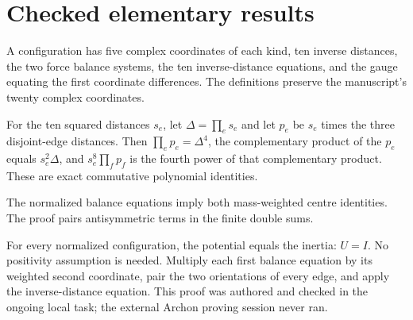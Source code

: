 \chapter{Checked elementary results}

\begin{definition}
\label{bp:configuration}
\leanok
A configuration has five complex coordinates of each kind, ten inverse
distances, the two force balance systems, the ten inverse-distance equations,
and the gauge equating the first coordinate differences.
The definitions preserve the manuscript's twenty complex coordinates.
\end{definition}

\begin{lemma}
\label{bp:products}
\leanok
For the ten squared distances $s_e$, let $\Delta=\prod_e s_e$ and let $p_e$
be $s_e$ times the three disjoint-edge distances. Then
$\prod_e p_e=\Delta^4$, the complementary product of the $p_e$ equals
$s_e^2\Delta$, and $s_e^8\prod_f p_f$ is the fourth power of that
complementary product. These are exact commutative polynomial identities.
\end{lemma}

\begin{lemma}
\label{bp:center}
\leanok
The normalized balance equations imply both mass-weighted centre identities.
The proof pairs antisymmetric terms in the finite double sums.
\end{lemma}

\begin{lemma}
\label{bp:virial}
\leanok
For every normalized configuration, the potential equals the inertia:
$U=I$. No positivity assumption is needed. Multiply each first balance equation
by its weighted second coordinate, pair the two orientations of every edge,
and apply the inverse-distance equation. This proof was authored and checked
in the ongoing local task; the external Archon proving session never ran.
\end{lemma}

